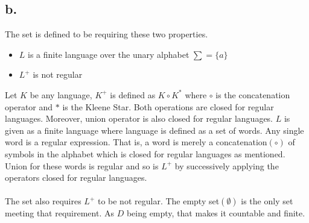 \documentclass[12pt]{article}
\begin{document}
\subsection*{b.}
The set is defined to be requiring these two properties.
\begin{itemize}
    \item $L$ is a finite language over the unary alphabet $\sum = \{a\}$
    \item $L^+$ is not regular
\end{itemize}
Let $K$ be any language, $K^+$ is defined as $K\circ K^*$ where $\circ$ is the concatenation operator and $*$ is the Kleene Star. Both operations are closed for regular languages. Moreover, union operator is also closed for regular languages. $L$ is given as a finite language where language is defined as a set of words. Any single word is a regular expression. That is, a word is merely a concatenation$(\circ)$ of symbols in the alphabet which is closed for regular languages as mentioned. Union for these words is regular and so is $L^+$ by successively applying the operators closed for regular languages.\\~\\
The set also requires $L^+$ to be not regular. The empty set$(\emptyset)$ is the only set meeting that requirement. As $D$ being empty, that makes it countable and finite.
\\~\\
\end{document}
